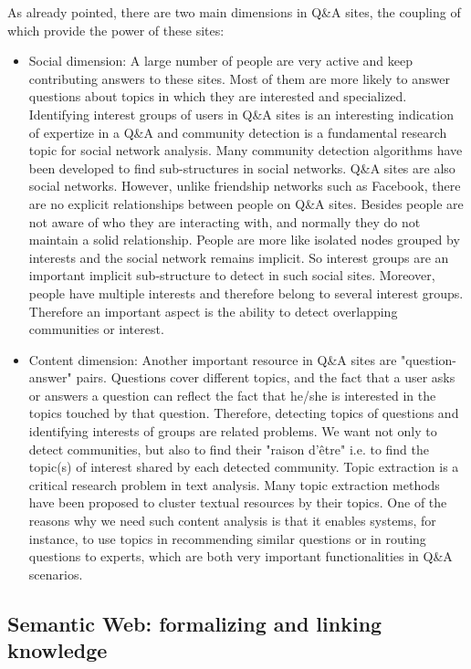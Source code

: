 As already pointed, there are two main dimensions in Q\&A sites, the coupling of which provide the power of these sites:
\begin{itemize}
\item{Social dimension:} 
A large number of people are very active and keep contributing answers to these sites. Most of them are more likely to answer questions about topics in which they are interested and specialized. Identifying interest groups of users in Q\&A sites is an interesting indication of expertize in a Q\&A and community detection is a fundamental research topic for social network analysis. Many community detection algorithms have been developed to find sub-structures in social networks. Q\&A sites are also social networks. However, unlike friendship networks such as Facebook, there are no explicit relationships between people on Q\&A sites. Besides people are not aware of who they are interacting with, and normally they do not maintain a solid relationship. People are more like isolated nodes grouped by interests and the social network remains implicit. So interest groups are an important implicit sub-structure to detect in such social sites. Moreover, people have multiple interests and therefore belong to several interest groups. Therefore an important aspect is the ability to detect overlapping communities or interest. 

\item{Content dimension:}
Another important resource in Q\&A sites are "question-answer" pairs. Questions cover different topics, and the fact that a user asks or answers a question can reflect the fact that he/she is interested in the topics touched by that question. Therefore, detecting topics of questions and identifying interests of groups are related problems. We want not only to detect communities, but also to find their "raison d'\^etre" i.e. to find the topic(s) of interest shared by each detected community. Topic extraction is a critical research problem in text analysis. Many topic extraction methods have been proposed to cluster textual resources by their topics. One of the reasons why we need such content analysis is that it enables systems, for instance, to use topics in recommending similar questions or in routing questions to experts, which are both very important functionalities in Q\&A scenarios.

\end{itemize}

\subsection{Semantic Web: formalizing and linking knowledge}


